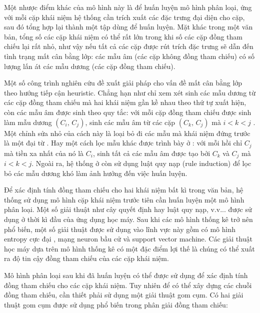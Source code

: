 Một nhược điểm khác của mô hình này là để huấn luyện mô hình phân loại, ứng với mỗi cặp khái niệm hệ thống cần trích xuất các đặc trưng đại diện cho cặp, sau đó tổng hợp lại thành một tập dùng để huấn luyện. Mặt khác trong một văn bản, tổng số các cặp khái niệm có thể rất lớn trong khi số các cặp đồng tham chiếu lại rất nhỏ, như vậy nếu tất cả các cặp được rút trích đặc trưng sẽ dẫn đến tình trạng mất cân bằng lớp: các mẫu âm (các cặp không đồng tham chiếu) có số lượng lấn át các mẫu dương (các cặp đồng tham chiếu).

Một số công trình nghiên cứu đề xuất giải pháp cho vấn đề mất cân bằng lớp theo hướng tiếp cận heuristic. Chẳng hạn như chỉ xem xét sinh các mẫu dương từ các cặp đồng tham chiếu mà hai khái niệm gần kề nhau theo thứ tự xuất hiện, còn các mẫu âm được sinh theo quy tắc: với mỗi cặp đồng tham chiếu được sinh làm mẫu dương $(C_i,\,C_j)$, sinh các mẫu âm từ các cặp $(C_k,\,C_j)$ mà $i<k<j$ \cite{Soon2001}. Một chỉnh sửa nhỏ của cách này là loại bỏ đi các mẫu mà khái niệm đứng trước là một đại từ \cite{VincentNg2002a}. Hay một cách lọc mẫu khác được trình bày ở \cite{VincentNg2002b}: với mỗi hồi chỉ $C_j$ mà tiền xa nhất của nó là $C_i$, sinh tất cả các mẫu âm được tạo bởi $C_k$ và $C_j$ mà $i<k<j$. Ngoài ra, hệ thống ở \cite{VincentNg2002b} còn sử dụng luật quy nạp (rule induction) để lọc bỏ các mẫu dương khó làm ảnh hưởng đến việc huấn luyện.

Để xác định tính đồng tham chiếu cho hai khái niệm bất kì trong văn bản, hệ thống sử dụng mô hình cặp khái niệm trước tiên cần huấn luyện một mô hình phân loại. Một số giải thuật như cây quyết định hay luật quy nạp, v.v... được sử dụng ở thời kì đầu của ứng dụng học máy. Sau khi các mô hình thống kê trở nên phổ biến, một số giải thuật được sử dụng vào lĩnh vực này gồm có mô hình entropy cực đại \cite{Berger1996}, mạng neuron bầu cử \cite{Freund1999} và support vector machine. Các giải thuật học máy dựa trên mô hình thống kê có một đặc điểm lợi thế là chúng có thể xuất ra độ tin cậy đồng tham chiếu của các cặp khái niệm. 

Mô hình phân loại sau khi đã huấn luyện có thể được sử dụng để xác định tính đồng tham chiếu cho các cặp khái niệm. Tuy nhiên để có thể xây dựng các chuỗi đồng tham chiếu, cần thiết phải sử dụng một giải thuật gom cụm. Có hai giải thuật gom cụm được sử dụng phổ biến trong phân giải đồng tham chiếu:

